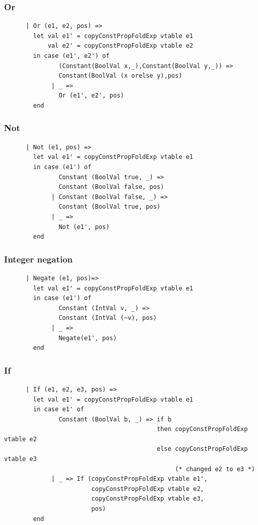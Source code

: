 \documentclass[11pt]{article}
\begin{document}
    \subsubsection{Or} \label{ccpfor}
    \begin{lstlisting}
      | Or (e1, e2, pos) =>
        let val e1' = copyConstPropFoldExp vtable e1
            val e2' = copyConstPropFoldExp vtable e2
        in case (e1', e2') of
               (Constant(BoolVal x,_),Constant(BoolVal y,_)) =>
               Constant(BoolVal (x orelse y),pos)
             | _ =>
               Or (e1', e2', pos)
        end
    \end{lstlisting}

    \subsubsection{Not} \label{ccpfnot}
    \begin{lstlisting}
      | Not (e1, pos) =>
        let val e1' = copyConstPropFoldExp vtable e1
        in case (e1') of
               Constant (BoolVal true, _) =>
               Constant (BoolVal false, pos)
             | Constant (BoolVal false, _) =>
               Constant (BoolVal true, pos)
             | _ =>
               Not (e1', pos)
        end
    \end{lstlisting}

    \subsubsection{Integer negation} \label{ccpfneg}
    \begin{lstlisting}
      | Negate (e1, pos)=>
        let val e1' = copyConstPropFoldExp vtable e1
        in case (e1') of
               Constant (IntVal v, _) =>
               Constant (IntVal (~v), pos)
             | _ =>
               Negate(e1', pos)
        end
    \end{lstlisting}

	\subsubsection{If}
	\begin{lstlisting}
      | If (e1, e2, e3, pos) =>
        let val e1' = copyConstPropFoldExp vtable e1
        in case e1' of
               Constant (BoolVal b, _) => if b
                                          then copyConstPropFoldExp vtable e2
                                          else copyConstPropFoldExp vtable e3
                                               (* changed e2 to e3 *)
             | _ => If (copyConstPropFoldExp vtable e1',
                        copyConstPropFoldExp vtable e2,
                        copyConstPropFoldExp vtable e3,
                        pos)
        end
    \end{lstlisting}
    
\end{document}
